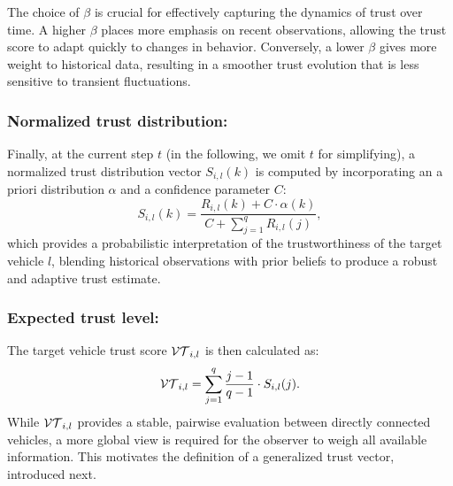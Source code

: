 \begin{remark}
    The choice of $\beta$ is crucial for effectively capturing the dynamics of trust over time. 
    A higher $\beta$ places more emphasis on recent observations, allowing the trust score to adapt quickly to changes in behavior. 
    Conversely, a lower $\beta$ gives more weight to historical data, resulting in a smoother trust evolution that is less sensitive to transient fluctuations.
\end{remark}
\subsubsection{Normalized trust distribution:}
Finally, at the current step $t$ (in the following, we omit $t$ for simplifying), a normalized trust distribution vector $S_{i,l}(k)$ is computed by incorporating an a priori distribution $\alpha$ and a confidence parameter $C$:
\begin{equation}
    S_{i,l}(k) = \dfrac{R_{i,l}(k) + C \cdot \alpha(k)}{C + \sum_{j=1}^{q} R_{i,l}(j)},
\end{equation}
which provides a probabilistic interpretation of the trustworthiness of the target vehicle $l$, blending historical observations with prior beliefs to produce a robust and adaptive trust estimate. 
\subsubsection{Expected trust level:}
The target vehicle trust score $\mathcal{VT}_{i,l}$ is then calculated as:
\begin{equation}
    \mathcal{VT}_{i,l} = \sum_{j=1}^{q} \dfrac{j-1}{q-1} \cdot S_{i,l}(j).
\end{equation}
While $\mathcal{VT}_{i,l}$ provides a stable, pairwise evaluation between directly connected vehicles, a more global view is required for the observer to weigh all available information. This motivates the definition of a generalized trust vector, introduced next.

